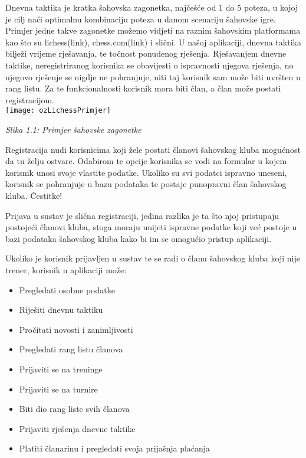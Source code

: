 \documentclass{article}
\begin{document}
		Dnevna taktika je kratka šahovska zagonetka, najčešće od 1 do 5 poteza, u kojoj je cilj naći optimalnu kombinaciju poteza u danom scenariju šahovske igre. Primjer jedne takve zagonetke možemo vidjeti na raznim šahovskim platformama kao što su lichess(link), chess.com(link) i slični. U našoj aplikaciji, dnevna taktika bilježi vrijeme rješavanja, te točnost ponudenog rješenja. Rješavanjem dnevne taktike, neregistriranog korisnika se obavijesti o ispravnosti njegova rješenja, no njegovo rješenje se nigdje ne pohranjuje, niti taj korisnik sam može biti uvršten u rang listu. Za te funkcionalnosti korisnik mora biti član, a član može postati registracijom.\\
		
		\texttt{[image: ozLichessPrimjer]}
		\begin{center}
			\textit{Slika 1.1: Primjer šahovske zagonetke}
		\end{center}
		
		Registracija nudi korisnicima koji žele postati članovi šahovskog kluba mogućnost da tu želju ostvare. Odabirom te opcije korisnika se vodi na formular u kojem korisnik unosi svoje vlastite podatke. Ukoliko su svi podatci ispravno uneseni, korisnik se pohranjuje u bazu podataka te postaje punopravni član šahovskog kluba. Čestitke!
		
		Prijava u sustav je slična registraciji, jedina razlika je ta što njoj pristupaju postojeći članovi kluba, stoga moraju unijeti ispravne podatke koji već postoje u bazi podataka šahovskog kluba kako bi im se omogućio pristup aplikaciji. 
		
		Ukoliko je korisnik prijavljen u sustav te se radi o članu šahovskog kluba koji nije trener, korisnik u aplikaciji može: 
		\begin{itemize}
			\item Pregledati osobne podatke 
			\item Riješiti dnevnu taktiku 
			\item Pročitati novosti i zanimljivosti 
			\item Pregledati rang listu članova 
			\item Prijaviti se na treninge 
			\item Prijaviti se na turnire
			\item Biti dio rang liste svih članova 
			\item Prijaviti rješenja dnevne taktike 
			\item Platiti članarinu i pregledati svoja prijašnja plaćanja 
		\end{itemize}
		
\end{document}
